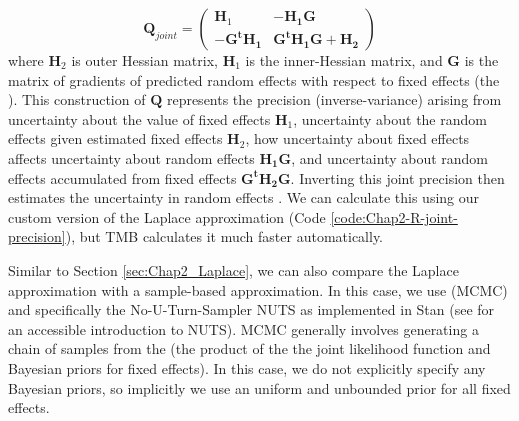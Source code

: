 \begin{equation} \label{eq:Chap2_joint_precision}
    \mathbf Q_{joint} = 
    \begin{pmatrix}
      \mathbf H_1 & -\mathbf{H_1 G} \\
      -\mathbf{G^t H_1} & \mathbf{G^t H_1 G + H_2}
    \end{pmatrix}
\end{equation}
where \( \mathbf H_2 \) is outer Hessian matrix, \( \mathbf H_1 \) is the inner-Hessian matrix, and \( \mathbf G \) is the matrix of gradients of predicted random effects with respect to fixed effects (the ).  This construction of \( \mathbf Q \) represents the precision (inverse-variance) arising from uncertainty about the value of fixed effects \(\mathbf H_1\), uncertainty about the random effects given estimated fixed effects \(\mathbf H_2\), how uncertainty about fixed effects affects uncertainty about random effects \( \mathbf{H_1 G} \), and uncertainty about random effects accumulated from fixed effects \(\mathbf{G^t H_2 G}\).  Inverting this joint precision then estimates the uncertainty in random effects \cite{kass_approximate_1989}.  We can calculate this using our custom version of the Laplace approximation (Code \ref{code:Chap2-R-joint-precision}), but TMB calculates it much faster automatically.    

\lstset{style=Rcode} 


Similar to Section \ref{sec:Chap2_Laplace}, we can also compare the Laplace approximation with a sample-based approximation.  In this case, we use  (MCMC) and specifically the No-U-Turn-Sampler NUTS \cite{hoffman_no-u-turn_2014} as implemented in Stan (see \cite{monnahan_faster_2017} for an accessible introduction to NUTS). MCMC generally involves generating a chain of samples from the  (the product of the the joint likelihood function and Bayesian priors for fixed effects).  In this case, we do not explicitly specify any Bayesian priors, so implicitly we use an uniform and unbounded prior for all fixed effects.

